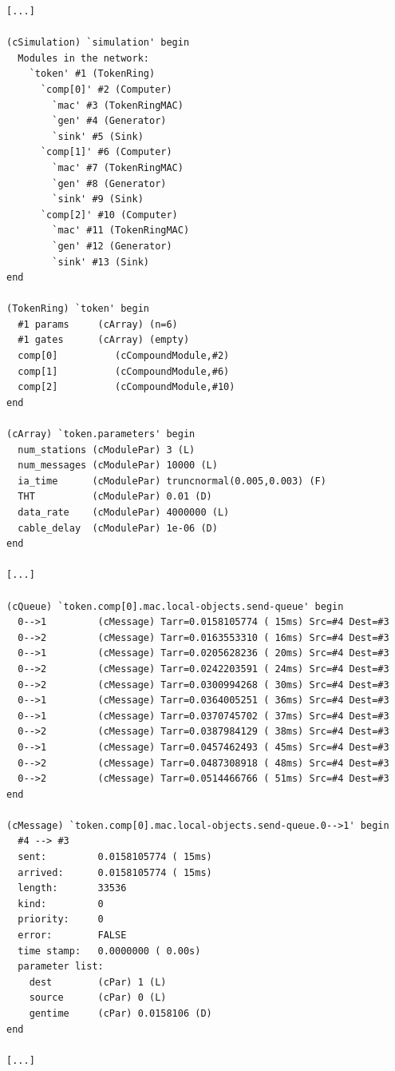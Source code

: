 \begin{Verbatim}[commandchars=\\\{\}]
[...]

(cSimulation) `simulation' begin
  Modules in the network:
    `token' #1 (TokenRing)
      `comp[0]' #2 (Computer)
        `mac' #3 (TokenRingMAC)
        `gen' #4 (Generator)
        `sink' #5 (Sink)
      `comp[1]' #6 (Computer)
        `mac' #7 (TokenRingMAC)
        `gen' #8 (Generator)
        `sink' #9 (Sink)
      `comp[2]' #10 (Computer)
        `mac' #11 (TokenRingMAC)
        `gen' #12 (Generator)
        `sink' #13 (Sink)
end

(TokenRing) `token' begin
  #1 params     (cArray) (n=6)
  #1 gates      (cArray) (empty)
  comp[0]          (cCompoundModule,#2)
  comp[1]          (cCompoundModule,#6)
  comp[2]          (cCompoundModule,#10)
end

(cArray) `token.parameters' begin
  num_stations (cModulePar) 3 (L)
  num_messages (cModulePar) 10000 (L)
  ia_time      (cModulePar) truncnormal(0.005,0.003) (F)
  THT          (cModulePar) 0.01 (D)
  data_rate    (cModulePar) 4000000 (L)
  cable_delay  (cModulePar) 1e-06 (D)
end

[...]

(cQueue) `token.comp[0].mac.local-objects.send-queue' begin
  0-->1         (cMessage) Tarr=0.0158105774 ( 15ms) Src=#4 Dest=#3
  0-->2         (cMessage) Tarr=0.0163553310 ( 16ms) Src=#4 Dest=#3
  0-->1         (cMessage) Tarr=0.0205628236 ( 20ms) Src=#4 Dest=#3
  0-->2         (cMessage) Tarr=0.0242203591 ( 24ms) Src=#4 Dest=#3
  0-->2         (cMessage) Tarr=0.0300994268 ( 30ms) Src=#4 Dest=#3
  0-->1         (cMessage) Tarr=0.0364005251 ( 36ms) Src=#4 Dest=#3
  0-->1         (cMessage) Tarr=0.0370745702 ( 37ms) Src=#4 Dest=#3
  0-->2         (cMessage) Tarr=0.0387984129 ( 38ms) Src=#4 Dest=#3
  0-->1         (cMessage) Tarr=0.0457462493 ( 45ms) Src=#4 Dest=#3
  0-->2         (cMessage) Tarr=0.0487308918 ( 48ms) Src=#4 Dest=#3
  0-->2         (cMessage) Tarr=0.0514466766 ( 51ms) Src=#4 Dest=#3
end

(cMessage) `token.comp[0].mac.local-objects.send-queue.0-->1' begin
  #4 --> #3
  sent:         0.0158105774 ( 15ms)
  arrived:      0.0158105774 ( 15ms)
  length:       33536
  kind:         0
  priority:     0
  error:        FALSE
  time stamp:   0.0000000 ( 0.00s)
  parameter list:
    dest        (cPar) 1 (L)
    source      (cPar) 0 (L)
    gentime     (cPar) 0.0158106 (D)
end

[...]
\end{Verbatim}

